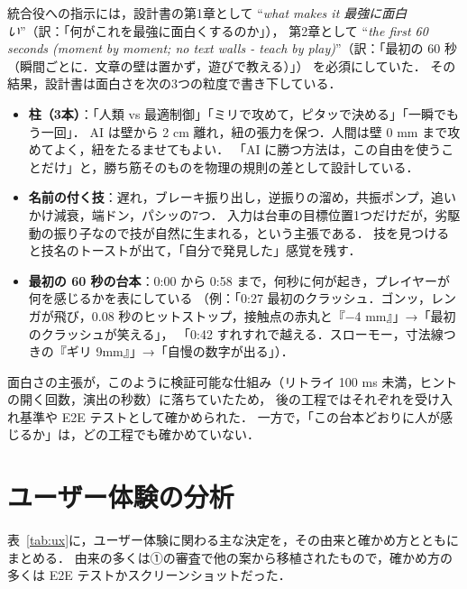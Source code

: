\documentclass[a4paper,10pt]{ltjsarticle}
\newcommand{\tabref}[1]{表~\ref{#1}}
\begin{document}
統合役への指示には，設計書の第1章として ``\textit{what makes it 最強に面白い}''（訳：「何がこれを最強に面白くするのか」），
第2章として ``\textit{the first 60 seconds (moment by moment; no text walls - teach by play)}''（訳：「最初の 60 秒（瞬間ごとに．文章の壁は置かず，遊びで教える）」） を必須にしていた．
その結果，設計書は面白さを次の3つの粒度で書き下している．
\begin{itemize}
  \item \textbf{柱（3本）}：「人類 vs 最適制御」「ミリで攻めて，ピタッで決める」「一瞬でもう一回」．
  AI は壁から 2 cm 離れ，紐の張力を保つ．人間は壁 0 mm まで攻めてよく，紐をたるませてもよい．
  「AI に勝つ方法は，この自由を使うことだけ」と，勝ち筋そのものを物理の規則の差として設計している．
  \item \textbf{名前の付く技}：遅れ，ブレーキ振り出し，逆振りの溜め，共振ポンプ，追いかけ減衰，端ドン，パシッの7つ．
  入力は台車の目標位置1つだけだが，劣駆動の振り子なので技が自然に生まれる，という主張である．
  技を見つけると技名のトーストが出て，「自分で発見した」感覚を残す．
  \item \textbf{最初の 60 秒の台本}：0:00 から 0:58 まで，何秒に何が起き，プレイヤーが何を感じるかを表にしている
  （例：「0:27 最初のクラッシュ．ゴンッ，レンガが飛び，0.08 秒のヒットストップ，接触点の赤丸と『−4 mm』」→「最初のクラッシュが笑える」，
  「0:42 すれすれで越える．スローモー，寸法線つきの『ギリ 9mm』」→「自慢の数字が出る」）．
\end{itemize}
面白さの主張が，このように検証可能な仕組み（リトライ 100 ms 未満，ヒントの開く回数，演出の秒数）に落ちていたため，
後の工程ではそれぞれを受け入れ基準や E2E テストとして確かめられた．
一方で，「この台本どおりに人が感じるか」は，どの工程でも確かめていない．

\section{ユーザー体験の分析}
\label{sec:ux}

\tabref{tab:ux}に，ユーザー体験に関わる主な決定を，その由来と確かめ方とともにまとめる．
由来の多くは①の審査で他の案から移植されたもので，確かめ方の多くは E2E テストかスクリーンショットだった．
\end{document}
